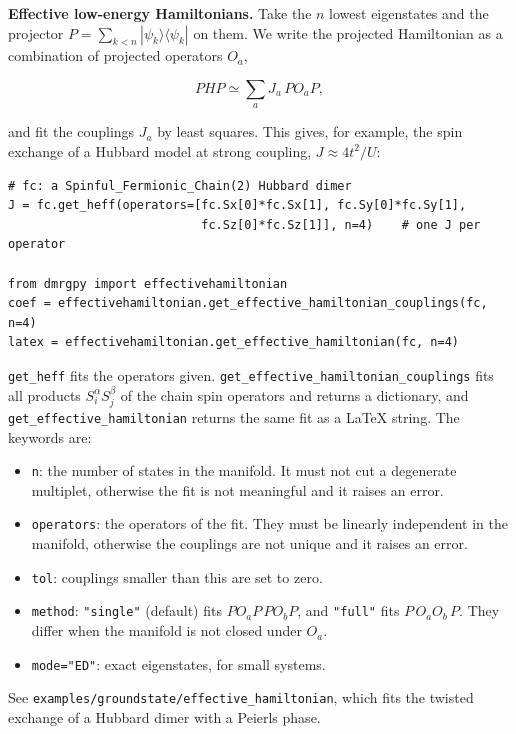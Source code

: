 \documentclass[11pt]{article}
\providecommand{\tightlist}{\setlength{\itemsep}{0pt}\setlength{\parskip}{0pt}}
\begin{document}
\textbf{Effective low-energy Hamiltonians.} Take the \(n\) lowest eigenstates and
the projector \(P=\sum_{k<n}|\psi_k\rangle\langle\psi_k|\) on them. We write
the projected Hamiltonian as a combination of projected operators \(O_a\),

\[PHP\simeq\sum_aJ_a\,PO_aP,\]

and fit the couplings \(J_a\) by least squares. This gives, for example, the
spin exchange of a Hubbard model at strong coupling,
\(J\approx4t^2/U\):

\begin{lstlisting}
# fc: a Spinful_Fermionic_Chain(2) Hubbard dimer
J = fc.get_heff(operators=[fc.Sx[0]*fc.Sx[1], fc.Sy[0]*fc.Sy[1],
                           fc.Sz[0]*fc.Sz[1]], n=4)    # one J per operator

from dmrgpy import effectivehamiltonian
coef = effectivehamiltonian.get_effective_hamiltonian_couplings(fc, n=4)
latex = effectivehamiltonian.get_effective_hamiltonian(fc, n=4)
\end{lstlisting}

\texttt{get\_\allowbreak{}heff} fits the operators given. \texttt{get\_\allowbreak{}effective\_\allowbreak{}hamiltonian\_\allowbreak{}couplings}
fits all products \(S^\alpha_iS^\beta_j\) of the chain spin operators and
returns a dictionary, and \texttt{get\_\allowbreak{}effective\_\allowbreak{}hamiltonian} returns the same fit
as a LaTeX string. The keywords are:

\begin{itemize}
\tightlist
\item
  \texttt{n}: the number of states in the manifold. It must not cut a degenerate
  multiplet, otherwise the fit is not meaningful and it raises an error.
\item
  \texttt{operators}: the operators of the fit. They must be linearly independent
  in the manifold, otherwise the couplings are not unique and it raises an
  error.
\item
  \texttt{tol}: couplings smaller than this are set to zero.
\item
  \texttt{method}: \texttt{"single"} (default) fits \(PO_aP\,PO_bP\), and \texttt{"full"} fits
  \(P\,O_aO_b\,P\). They differ when the manifold is not closed under \(O_a\).
\item
  \texttt{mode="ED"}: exact eigenstates, for small systems.
\end{itemize}

See \texttt{examples/groundstate/effective\_\allowbreak{}hamiltonian}, which fits the twisted
exchange of a Hubbard dimer with a Peierls phase.
\end{document}
